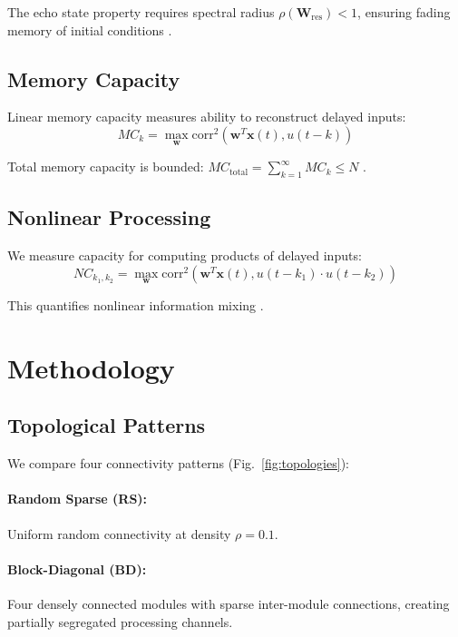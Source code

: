 \documentclass[11pt]{article}
\begin{document}
The echo state property requires spectral radius $\rho(\mathbf{W}_{\text{res}}) < 1$, ensuring fading memory of initial conditions \citep{jaeger2001echo}.

\subsection{Memory Capacity}

Linear memory capacity measures ability to reconstruct delayed inputs:
\begin{equation}
MC_k = \max_{\mathbf{w}} \text{corr}^2(\mathbf{w}^T\mathbf{x}(t), u(t-k))
\end{equation}

Total memory capacity is bounded: $MC_{\text{total}} = \sum_{k=1}^{\infty} MC_k \leq N$ \citep{jaeger2001short}.

\subsection{Nonlinear Processing}

We measure capacity for computing products of delayed inputs:
\begin{equation}
NC_{k_1,k_2} = \max_{\mathbf{w}} \text{corr}^2(\mathbf{w}^T\mathbf{x}(t), u(t-k_1) \cdot u(t-k_2))
\end{equation}

This quantifies nonlinear information mixing \citep{dambre2012information}.

\section{Methodology}

\subsection{Topological Patterns}

We compare four connectivity patterns (Fig.~\ref{fig:topologies}):

\paragraph{Random Sparse (RS):} Uniform random connectivity at density $\rho = 0.1$.

\paragraph{Block-Diagonal (BD):} Four densely connected modules with sparse inter-module connections, creating partially segregated processing channels.
\end{document}
